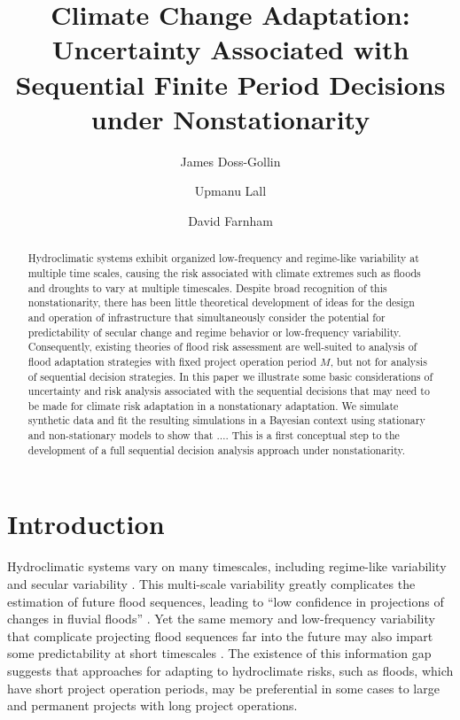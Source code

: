 \documentclass[12pt]{article}
\title{Climate Change Adaptation: Uncertainty Associated with Sequential Finite Period Decisions under Nonstationarity}
\author[1,2]{James Doss-Gollin}
\author[1,2]{Upmanu Lall}
\author[1,2]{David Farnham}
\affil[1]{Columbia Water Center, Columbia University}
\affil[2]{Department of Earth and Environmental Engineering, Columbia University}
\begin{document}
\maketitle
\RaggedRight{}
\begin{abstract}
  Hydroclimatic systems exhibit organized low-frequency and regime-like variability at multiple time scales, causing the risk associated with climate extremes such as floods and droughts to vary at multiple timescales.
  Despite broad recognition of this nonstationarity, there has been little theoretical development of ideas for the design and operation of infrastructure that simultaneously consider the potential for predictability of secular change and regime behavior or low-frequency variability.
  Consequently, existing theories of flood risk assessment are well-suited to analysis of flood adaptation strategies with fixed project operation period \(M\), but not for analysis of sequential decision strategies.
  In this paper we illustrate some basic considerations of uncertainty and risk analysis associated with the sequential decisions that may need to be made for climate risk adaptation in a nonstationary adaptation.
  We simulate synthetic data and fit the resulting simulations in a Bayesian context using stationary and non-stationary models to show that \(\ldots{}\).
  This is a first conceptual step to the development of a full sequential decision analysis approach under nonstationarity.
\end{abstract}


\section{Introduction}

Hydroclimatic systems vary on many timescales, including regime-like variability and secular variability  \citep{Milly2008,Merz2014,Hurst1951,Sveinsson2005,Hodgkins2017,Matalas2012}.
This multi-scale variability greatly complicates the estimation of future flood sequences, leading to ``low confidence in projections of changes in fluvial floods'' \citep{IPCC2012}.
Yet the same memory and low-frequency variability that complicate projecting flood sequences far into the future may also impart some predictability at short timescales \citep{Jain2001}.
The existence of this information gap suggests that approaches for adapting to hydroclimate risks, such as floods, which have short project operation periods, may be preferential in some cases to large and permanent projects with long project operations.
\end{document}
